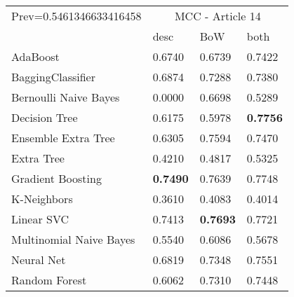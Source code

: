 \begin{tabular}{|l|l|l|l| }
\hline
Prev=0.5461346633416458 &  \multicolumn{3}{c|}{MCC - Article 14} \\
\cline{2-4} & desc & BoW & both \\ \hline
AdaBoost                & 0.6740 & 0.6739 & 0.7422\\
BaggingClassifier       & 0.6874 & 0.7288 & 0.7380\\
Bernoulli Naive Bayes   & 0.0000 & 0.6698 & 0.5289\\
Decision Tree           & 0.6175 & 0.5978 & {\bf 0.7756}\\
Ensemble Extra Tree     & 0.6305 & 0.7594 & 0.7470\\
Extra Tree              & 0.4210 & 0.4817 & 0.5325\\
Gradient Boosting       & {\bf 0.7490} & 0.7639 & 0.7748\\
K-Neighbors             & 0.3610 & 0.4083 & 0.4014\\
Linear SVC              & 0.7413 & {\bf 0.7693} & 0.7721\\
Multinomial Naive Bayes & 0.5540 & 0.6086 & 0.5678\\
Neural Net              & 0.6819 & 0.7348 & 0.7551\\
Random Forest           & 0.6062 & 0.7310 & 0.7448\\
\hline
\end{tabular}